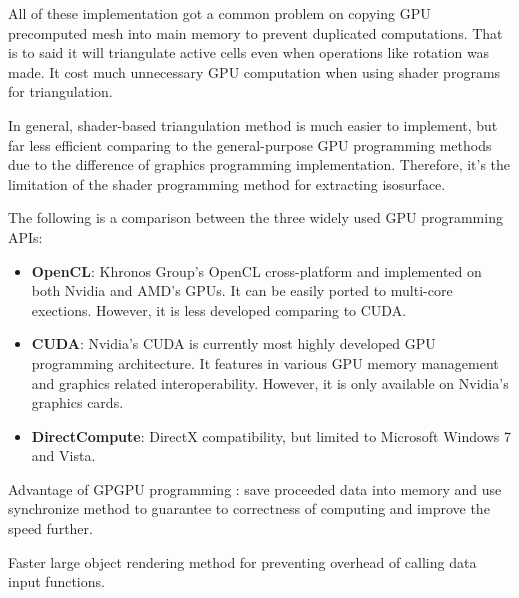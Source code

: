 \documentclass[11pt, b5paper]{report}
\begin{document}
All of these implementation got a common problem on copying GPU precomputed 
mesh into main memory to prevent duplicated computations. That is to said 
it will triangulate active cells even when operations like rotation was 
made. It cost much unnecessary GPU computation when using shader programs 
for triangulation. 


In general, shader-based triangulation method is much easier to implement,
but far less efficient comparing to the general-purpose GPU programming 
methods due to the difference of graphics programming implementation. 
Therefore, it's the limitation of the shader programming method for 
extracting isosurface\cite{goetz2005real}.


The following is a comparison between the three widely used GPU programming 
APIs:
\begin{itemize}
\item \textbf{OpenCL}: Khronos Group's OpenCL cross-platform and implemented 
on both Nvidia and AMD's GPUs. It can be easily ported to multi-core 
exections. However, it is less developed comparing to CUDA.
\item \textbf{CUDA}: Nvidia's CUDA is currently most highly developed GPU 
programming architecture. It features in various GPU memory management and 
graphics related interoperability. However, it is only available on 
Nvidia's graphics cards.
\item \textbf{DirectCompute}: DirectX compatibility, but limited to Microsoft 
Windows 7 and Vista.
\end{itemize}

Advantage of GPGPU programming : save proceeded data into memory and use 
synchronize method to guarantee to correctness of computing and improve the 
speed further.


Faster large object rendering method for preventing overhead of calling
data input functions.

\end{document}
